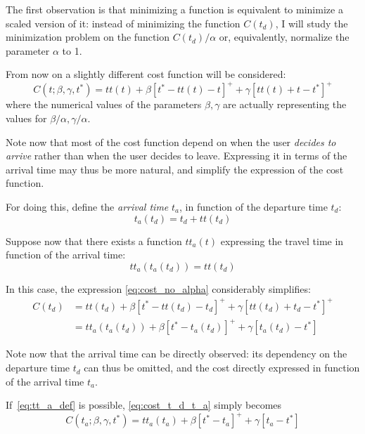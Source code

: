 The first observation is that minimizing a function is equivalent to minimize a scaled version of it:
instead of minimizing the function \(C(t_d)\),
I will study the minimization problem on the function \(C(t_d)/\alpha\) or,
equivalently, normalize the parameter \(\alpha\) to 1.

From now on a slightly different cost function will be considered:
\begin{equation}
  \label{eq:cost_no_alpha}
  C(t; \beta, \gamma, t^*) = tt(t) + \beta [t^* - tt(t) - t]^+ + \gamma[tt(t) + t - t^*]^+
\end{equation}
where the numerical values of the parameters \(\beta, \gamma\) are actually representing the values for \(\beta/\alpha, \gamma/\alpha\).

Note now that most of the cost function depend on when the user \textit{decides to arrive} rather than when the user decides to leave.
Expressing it in terms of the arrival time may thus be more natural,
and simplify the expression of the cost function.

For doing this, define the \textit{arrival time} \(t_a\), in function of the departure time \(t_d\):
\[t_a(t_d) = t_d + tt(t_d)\]

Suppose now that there exists a function \(tt_a(t)\) expressing the travel time in function of the arrival time:
\begin{equation}
  \label{eq:tt_a_def}
  tt_a(t_a(t_d)) = tt(t_d)
\end{equation}

In this case, the expression \eqref{eq:cost_no_alpha} considerably simplifies:
\begin{equation}
  \label{eq:cost_t_d_t_a}
  \begin{split}
    C(t_d) & = tt(t_d) + \beta [t^* - tt(t_d) - t_d]^+ + \gamma[tt(t_d) + t_d - t^*]^+ \\
           & = tt_a(t_a(t_d)) + \beta [t^* - t_a(t_d)]^+ + \gamma [t_a(t_d) - t^*]
  \end{split}
\end{equation}

Note now that the arrival time can be directly observed:
its dependency on the departure time \(t_d\) can thus be omitted,
and the cost directly expressed in function of the arrival time \(t_a\).

If~\eqref{eq:tt_a_def} is possible, \eqref{eq:cost_t_d_t_a} simply becomes
\begin{equation}
  \label{eq:cost_simplified}
  C(t_a; \beta, \gamma, t^*) = tt_a(t_a) + \beta [t^* - t_a]^+ + \gamma [t_a - t^*]
\end{equation}

